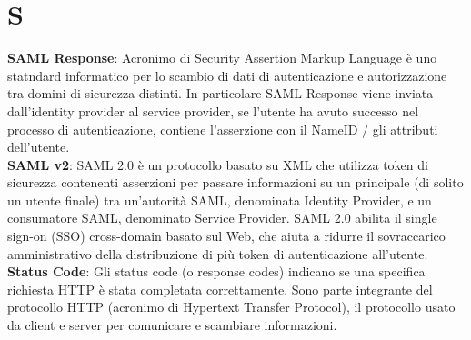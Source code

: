 \section{S}
\textbf{SAML Response}: Acronimo di Security Assertion Markup Language è uno statndard informatico per lo scambio di dati di autenticazione e autorizzazione tra domini di sicurezza distinti. In particolare SAML Response viene inviata dall'identity provider al service provider, se l'utente ha avuto successo nel processo di autenticazione, contiene l'asserzione con il NameID / gli attributi dell'utente.\\
\textbf{SAML v2}: SAML 2.0 è un protocollo basato su XML che utilizza token di sicurezza contenenti asserzioni per passare informazioni su un principale (di solito un utente finale) tra un'autorità SAML, denominata Identity Provider, e un consumatore SAML, denominato Service Provider. SAML 2.0 abilita il single sign-on (SSO) cross-domain basato sul Web, che aiuta a ridurre il sovraccarico amministrativo della distribuzione di più token di autenticazione all'utente.\\
\textbf{Status Code}: Gli status code (o response codes) indicano se una specifica richiesta HTTP è stata completata correttamente. Sono parte integrante del protocollo HTTP (acronimo di Hypertext Transfer Protocol), il protocollo usato da client e server per comunicare e scambiare informazioni.